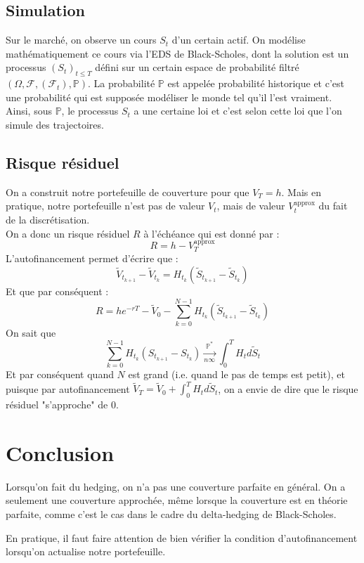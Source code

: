 \documentclass[12pt]{article}
\newcommand{\prob}{\mathbb{P}}
\newcommand{\f}{\mathcal{F}}
\begin{document}
\subsection{Simulation}
Sur le marché, on observe un cours $S_t$ d'un certain actif. On modélise mathématiquement ce cours via l'EDS de Black-Scholes, dont la solution est un processus $(S_t)_{t \leq T}$ défini sur un certain espace de probabilité filtré $(\Omega, \f, (\f_t), \prob)$. La probabilité $\prob$ est appelée probabilité historique et c'est une probabilité qui est supposée modéliser le monde tel qu'il l'est vraiment. Ainsi, sous $\prob$, le processus $S_t$ a une certaine loi et c'est selon cette loi que l'on simule des trajectoires. \\

\subsection{Risque résiduel}
On a construit notre portefeuille de couverture pour que $V_T = h$. Mais en pratique, notre portefeuille n'est pas de valeur $V_t$, mais de valeur $V_t^{\text{approx}}$ du fait de la discrétisation. \\

On a donc un risque résiduel $R$ à l'échéance qui est donné par :
$$R = h-V_T^{\text{approx}}$$
L'autofinancement permet d'écrire que :
$$\tilde{V}_{t_{k+1}}-\tilde{V}_{t_{k}} = H_{t_k} (\tilde{S}_{t_{k+1}} - \tilde{S}_{t_k})$$
Et que par conséquent :
$$R = he^{-rT} - \tilde{V}_0 - \sum_{k=0}^{N-1} H_{t_k}(\tilde{S}_{t_{k+1}} - \tilde{S}_{t_k})$$
On sait que 
$$\sum_{k=0}^{N-1} H_{t_k}(S_{t_{k+1}} - S_{t_k}) \xrightarrow[n \infty]{\prob^*} \int_0^T H_t d\tilde{S}_t$$
Et par conséquent quand $N$ est grand (i.e. quand le pas de temps est petit), et puisque par autofinancement $\tilde{V}_T = \tilde{V}_0 + \int_0^T H_t d\tilde{S}_t$, on a envie de dire que le risque résiduel "s'approche" de $0$.

\section{Conclusion}
Lorsqu'on fait du hedging, on n'a pas une couverture parfaite en général. On a seulement une couverture approchée, même lorsque la couverture est en théorie parfaite, comme c'est le cas dans le cadre du delta-hedging de Black-Scholes.

En pratique, il faut faire attention de bien vérifier la condition d'autofinancement lorsqu'on actualise notre portefeuille.
\end{document}
